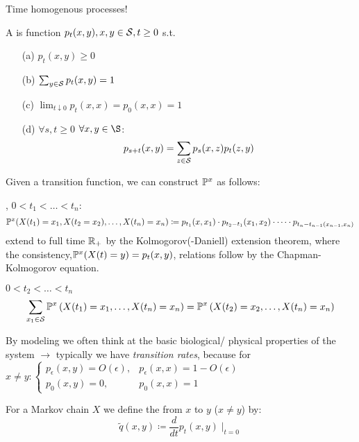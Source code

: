  Time homogenous processes! 

\begin{definition}\label{def:1.2}
    A  is function \(p_t(x,y),x,y\in\mathcal{S},t\geq 0\) s.t. 
    \begin{enumerate}
        \item[(a)]  \(p_t(x,y)\geq 0\)
        \item[(b)]  \(\sum_{y\in\mathcal{S}} p_t(x,y)=1\)
        \item[(c)]  \(\lim_{t\downarrow 0} p_t(x,x)=p_0(x,x)=1\)
        \item[(d)]  \(\forall s,t\geq 0\) \(\forall x,y\in \S\):\[p_{s+t}(x,y)=\sum_{z\in\mathcal{S}} p_s(x,z)p_t(z,y)\] 
    \end{enumerate}
\end{definition}

Given a transition function, we can construct \(\mathbb{P}^x\) as follows:

, \(0<t_1<\dots<t_n\): 
\begin{eqnarray*}
    \mathbb{P}^x(X(t_1)=x_1,X(t_2=x_2),\dots,X(t_n)=x_n)\coloneqq p_{t_1}(x,x_1)\cdot p_{t_2-t_1}(x_1,x_2)\cdot\dots\cdot p_{t_n-t_{n-1}(x_{n-1},x_n)}
\end{eqnarray*}
extend to full time \(\mathbb{R}_+\) by the Kolmogorov(-Daniell) extension theorem, where the consistency,\(\mathbb{P}^x(X(t)=y)=p_t(x,y)\), 
relations follow by the Chapman-Kolmogorov equation.

\begin{example*}
    \(0<t_2<\dots<t_n\)
    \begin{equation*}
       \sum_{x_1\in\mathcal{S}}\mathbb{P}^x\left(X(t_1)=x_1,\dots,X(t_n)=x_n\right)=\mathbb{P}^x\left(X(t_2)=x_2,\dots,X(t_n)=x_n\right)
    \end{equation*}
\end{example*}

By modeling we often think at the basic biological/ physical properties of the system \(\to\)
typically we have \textit{transition rates}, because for \( x\neq y: 
\begin{cases}
    p_\epsilon(x,y)=O(\epsilon),& p_\epsilon(x,x)=1-O(\epsilon)\\
      p_0(x,y)=0,&p_0(x,x)=1
\end{cases}
\)
\begin{definition}\label{def:1.3}
    For a Markov chain \(X\) we define the  from \(x\) to \(y\) (\(x\neq y\)) by:
    \[\tilde{q}(x,y)\coloneqq \frac{d}{dt}p_t(x,y)\mid_{t=0}\]
\end{definition}


